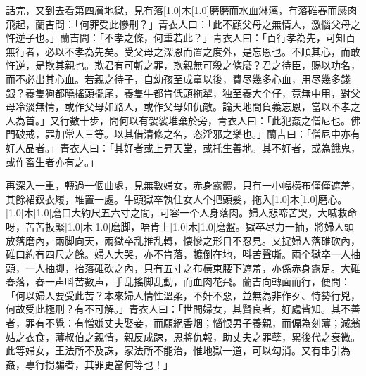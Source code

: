 \documentclass[a5paper, 12pt, openany]{book} %
\begin{document}
	話完，又到去看第四層地獄，見有落\scalebox{0.5}[1.0]{木}\scalebox{0.5}[1.0]{磨}磨而水血淋漓，有落碓舂而縻肉飛起，蘭吉問：「何罪受此慘刑？」青衣人曰：「此不顧父母之無情人，激惱父母之忤逆子也。」蘭吉問：「不孝之條，何重若此？」青衣人曰：「百行孝為先，可知百無行者，必以不孝為先矣。受父母之深恩而置之度外，是忘恩也。不順其心，而敢忤逆，是欺其親也。欺君有可斬之罪，欺親無可殺之條麼？君之待臣，賜以功名，而不必出其心血。若親之待子，自幼孩至成童以後，費尽幾多心血，用尽幾多錢銀？養隻狗都曉搖頭擺尾，養隻牛都肯低頭拖犁，独至養大个仔，竟無中用，對父母冷淡無情，或作父母如路人，或作父母如仇敵。論天地間負義忘恩，當以不孝之人為首。」又行數十步，問何以有袈裟堆棄於旁，青衣人曰：「此犯姦之僧尼也。佛門破戒，罪加常人三等。以其借清修之名，恣淫邪之樂也。」蘭吉曰：「僧尼中亦有好人品者。」青衣人曰：「其好者或上昇天堂，或托生善地。其不好者，或為餓鬼，或作畜生者亦有之。」

	再深入一重，轉過一個曲處，見無數婦女，赤身露體，只有一小幅橫布僅僅遮羞，其餘裙釵衣履，堆置一處。牛頭獄卒執住女人个把頭髮，拖入\scalebox{0.5}[1.0]{木}\scalebox{0.5}[1.0]{磨}心。\scalebox{0.5}[1.0]{木}\scalebox{0.5}[1.0]{磨}口大約尺五六寸之間，可容一个人身落肉。婦人悲啼苦哭，大喊救命呀，苦苦扳緊\scalebox{0.5}[1.0]{木}\scalebox{0.5}[1.0]{磨}脚，唔肯上\scalebox{0.5}[1.0]{木}\scalebox{0.5}[1.0]{磨}盤。獄卒尽力一抽，將婦人頭放落磨內，兩脚向天，兩獄卒乱推乱轉，悽慘之形目不忍見。又捉婦人落碓砍內，碓口約有四尺之餘。婦人大哭，亦不肯落，轆倒在地，呌苦聲嘶。兩个獄卒一人抽頭，一人抽脚，抬落碓砍之內，只有五寸之布橫束腰下遮羞，亦係赤身露足。大碓舂落，舂一声呌苦數声，手乱搖脚乱動，而血肉花飛。蘭吉向轉面而行，便問：「何以婦人要受此苦？本來婦人情性溫柔，不奸不惡，並無為非作歹、恃勢行兇，何故受此極刑？有不可解。」青衣人曰：「世間婦女，其賢良者，好處皆知。其不善者，罪有不覺：有憎嫌丈夫娶妾，而願絕香烟；惱恨男子養親，而偏為刻薄；減翁姑之衣食，薄叔伯之親情，親反成踈，恩將仇報，助丈夫之罪孽，累後代之衰微。此等婦女，王法所不及誅，家法所不能治，惟地獄一道，可以勾消。又有串引為姦，專行拐騙者，其罪更當何等也！」
\end{document}
